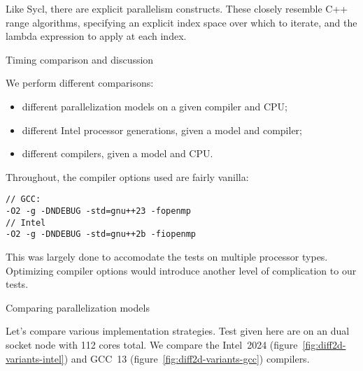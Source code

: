 
Like Sycl, there are explicit parallelism constructs.
These closely resemble C++ range algorithms,
specifying an explicit index space over which to iterate,
and the lambda expression to apply at each index.


 {Timing comparison and discussion}

We perform different comparisons:
\begin{itemize}
\item different parallelization models on a given compiler and CPU;
\item different Intel processor generations, given a model and compiler;
\item different compilers, given a model and CPU.
\end{itemize}
Throughout, the compiler options used are fairly vanilla:
\begin{verbatim}
// GCC:
-O2 -g -DNDEBUG -std=gnu++23 -fopenmp
// Intel
-O2 -g -DNDEBUG -std=gnu++2b -fiopenmp
\end{verbatim}
This was largely done to accomodate the tests
on multiple processor types.
Optimizing compiler options would introduce
another level of complication to our tests.

 {Comparing parallelization models}

Let's compare various implementation strategies.
Test given here are on an 
dual socket node with 112 cores total.
We compare the Intel~2024 (figure~\ref{fig:diff2d-variants-intel})
and GCC~13 (figure~\ref{fig:diff2d-variants-gcc})
compilers.

\begin{figure*}[t]
  \begingroup %
  
  
  \endgroup %
  \caption{Comparing implementation strategies, Intel 2024 compiler on a 112-core Sapphire Rapids node.}
  \label{fig:diff2d-variants-intel}
\end{figure*}

\begin{figure*}[t]
  \begingroup %
  
  
  \endgroup %
  \caption{Comparing implementation strategies, Gcc 2024 compiler on a 112-core Sapphire Rapids node.}
  \label{fig:diff2d-variants-gcc}
\end{figure*}

